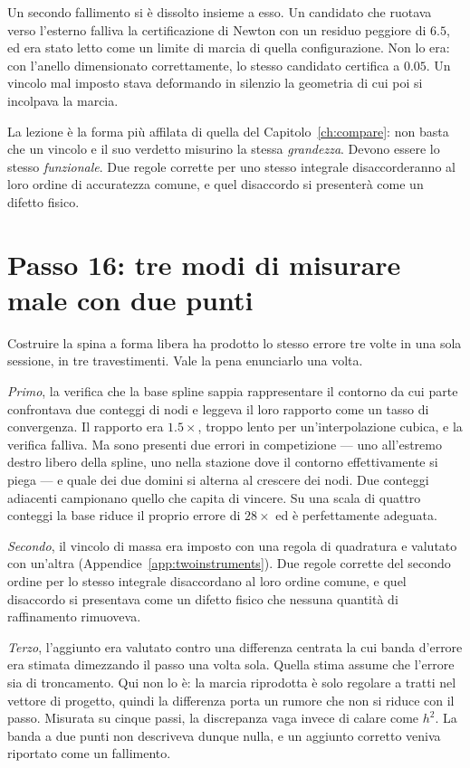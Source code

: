 Un secondo fallimento si è dissolto insieme a esso. Un candidato che
ruotava verso l'esterno falliva la certificazione di Newton con un
residuo peggiore di $6.5$, ed era stato letto come un limite di marcia
di quella configurazione. Non lo era: con l'anello dimensionato
correttamente, lo stesso candidato certifica a $0.05$. Un vincolo mal
imposto stava deformando in silenzio la geometria di cui poi si
incolpava la marcia.

La lezione è la forma più affilata di quella del
Capitolo~\ref{ch:compare}: non basta che un vincolo e il suo verdetto
misurino la stessa \emph{grandezza}. Devono essere lo stesso
\emph{funzionale}. Due regole corrette per uno stesso integrale
disaccorderanno al loro ordine di accuratezza comune, e quel
disaccordo si presenterà come un difetto fisico.

\section{Passo 16: tre modi di misurare male con due punti}
\label{app:twopoints}

Costruire la spina a forma libera ha prodotto lo stesso errore tre
volte in una sola sessione, in tre travestimenti. Vale la pena
enunciarlo una volta.

\emph{Primo}, la verifica che la base spline sappia rappresentare il
contorno da cui parte confrontava due conteggi di nodi e leggeva il
loro rapporto come un tasso di convergenza. Il rapporto era
$1.5\times$, troppo lento per un'interpolazione cubica, e la verifica
falliva. Ma sono presenti due errori in competizione --- uno
all'estremo destro libero della spline, uno nella stazione dove il
contorno effettivamente si piega --- e quale dei due domini si alterna
al crescere dei nodi. Due conteggi adiacenti campionano quello che
capita di vincere. Su una scala di quattro conteggi la base riduce il
proprio errore di $28\times$ ed è perfettamente adeguata.

\emph{Secondo}, il vincolo di massa era imposto con una regola di
quadratura e valutato con un'altra
(Appendice~\ref{app:twoinstruments}). Due regole corrette del secondo
ordine per lo stesso integrale disaccordano al loro ordine comune, e
quel disaccordo si presentava come un difetto fisico che nessuna
quantità di raffinamento rimuoveva.

\emph{Terzo}, l'aggiunto era valutato contro una differenza centrata
la cui banda d'errore era stimata dimezzando il passo una volta sola.
Quella stima assume che l'errore sia di troncamento. Qui non lo è: la
marcia riprodotta è solo regolare a tratti nel vettore di progetto,
quindi la differenza porta un rumore che non si riduce con il passo.
Misurata su cinque passi, la discrepanza vaga invece di calare come
$h^2$. La banda a due punti non descriveva dunque nulla, e un aggiunto
corretto veniva riportato come un fallimento.

